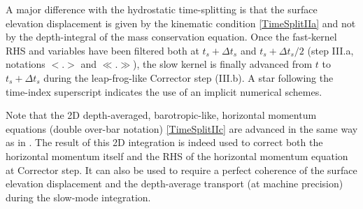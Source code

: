 A major difference with the hydrostatic time-splitting is that the surface elevation displacement is given by the kinematic condition \ref{TimeSplitIIa} and not by the depth-integral of the mass conservation equation. Once the fast-kernel RHS and variables have been filtered both at $t_s+\Delta t_s$ and $t_s+\Delta t_s/2$ (step III.a, notations $<.>$ and $\ll.\gg$), the slow kernel is finally advanced from $t$ to  $t_s+\Delta t_s$ during the leap-frog-like Corrector step (III.b). A star following the time-index superscript indicates the use of an implicit numerical schemes.

Note that the 2D depth-averaged, barotropic-like, horizontal momentum equations (double over-bar notation) \ref{TimeSplitIIc} are advanced in the same way as in \cite{shchepetkin_regional_2005}. The result of this 2D integration is indeed used to correct both the horizontal momentum itself and the RHS of the horizontal momentum equation at Corrector step. It can also be used to require a perfect coherence of the surface elevation displacement and the depth-average transport (at machine precision) during the slow-mode integration.

\color{blue}

